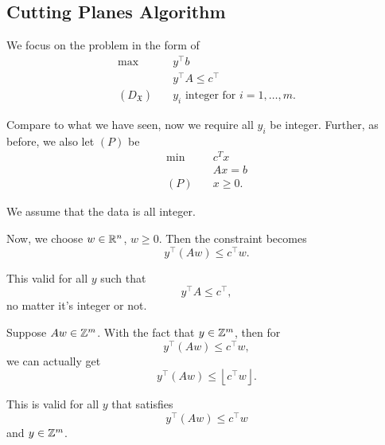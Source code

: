 \subsection{Cutting Planes Algorithm}
\begin{prev}
	We focus on the problem in the form of
	\begin{align*}
		\max~                    & y^{\top}b                                   \\
		                         & y^{\top}A\leq c^{\top}                      \\
		(D_{\mathfrak{X} })\quad & y_{i}\text{ integer for }i = 1, \ldots , m.
	\end{align*}
	\begin{note}
		Compare to what we have seen, now we require all \(y_{i}\) be integer. Further, as before, we also let \((P)\) be
		\begin{align*}
			\min~    & c^Tx     \\
			         & Ax = b   \\
			(P)\quad & x\geq 0.
		\end{align*}
	\end{note}
\end{prev}
\begin{remark}
	We assume that the data is all integer.
\end{remark}

Now, we choose \(w\in \mathbb{\MakeUppercase{R}}^n\), \(w\geq 0\). Then the constraint becomes
\[
	y^{\top}(Aw) \leq c^{\top}w.
\]
\begin{remark}
	This valid for all \(y\) such that
	\[
		y^{\top}A\leq c^{\top},
	\]
	no matter it's integer or not.
\end{remark}

Suppose \(Aw\in\mathbb{\MakeUppercase{Z}}^m\). With the fact that \(y\in \mathbb{\MakeUppercase{Z}}^m\), then for
\[
	y^{\top}(Aw)\leq c^{\top}w,
\]
we can actually get
\[
	y^{\top}(Aw)\leq \left\lfloor c^{\top}w \right\rfloor.
\]
\begin{remark}
	This is valid for all \(y\) that satisfies
	\[
		y^{\top}(Aw)\leq c^{\top}w
	\]
	and \(y\in \mathbb{\MakeUppercase{Z}}^m\).
\end{remark}
\begin{figure}[H]
	\centering
	\label{fig:Cutting-planes-tighter-bound}
\end{figure}


